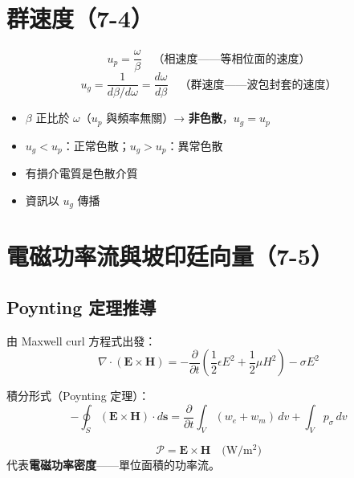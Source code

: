 \documentclass[12pt,a4paper]{article}
\newcommand{\vE}{\mathbf{E}}
\newcommand{\vH}{\mathbf{H}}
\begin{document}
\section{群速度（7-4）}

\begin{keybox}
\[
u_p = \frac{\omega}{\beta} \quad\text{（相速度——等相位面的速度）}
\]
\[
u_g = \frac{1}{d\beta/d\omega} = \frac{d\omega}{d\beta} \quad\text{（群速度——波包封套的速度）}
\]
\end{keybox}

\begin{notebox}[色散（Dispersion）]
\begin{itemize}[nosep]
  \item $\beta$ 正比於 $\omega$（$u_p$ 與頻率無關）→ \textbf{非色散}，$u_g = u_p$
  \item $u_g < u_p$：正常色散；$u_g > u_p$：異常色散
  \item 有損介電質是色散介質
  \item 資訊以 $u_g$ 傳播
\end{itemize}
\end{notebox}

\section{電磁功率流與坡印廷向量（7-5）}

\subsection{Poynting 定理推導}

由 Maxwell curl 方程式出發：
\[
\nabla\cdot(\vE\times\vH) = -\frac{\partial}{\partial t}\!\left(\frac{1}{2}\epsilon E^2 + \frac{1}{2}\mu H^2\right) - \sigma E^2
\]

積分形式（Poynting 定理）：
\[
-\oint_S (\vE\times\vH)\cdot d\mathbf{s} = \frac{\partial}{\partial t}\int_V (w_e+w_m)\,dv + \int_V p_\sigma\,dv
\]

\begin{keybox}
\[
\boxed{\boldsymbol{\mathcal{P}} = \vE\times\vH} \quad\text{(W/m$^2$)}
\]
代表\textbf{電磁功率密度}——單位面積的功率流。
\end{keybox}
\end{document}
